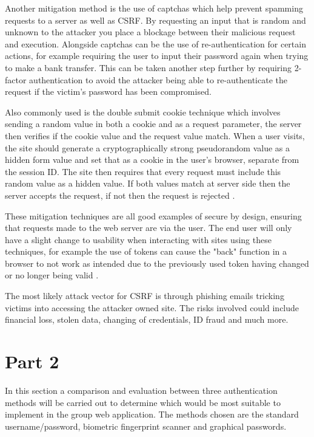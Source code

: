 \documentclass{ueacmpstyle}
\begin{document}
      Another mitigation method is the use of captchas which help prevent spamming requests 
      to a server as well as CSRF. By requesting an input that is random and unknown to the 
      attacker you place a blockage between their malicious request and execution. 
      Alongside captchas can be the use of re-authentication for certain actions, for example 
      requiring the user to input their password again when trying to make a bank transfer. 
      This can be taken another step further by requiring 2-factor authentication to avoid 
      the attacker being able to re-authenticate the request if the victim's password has been 
      compromised.

      Also commonly used is the double submit cookie technique which involves sending a random 
      value in both a cookie and as a request parameter, the server then verifies if the 
      cookie value and the request value match. When a user visits, the site should generate 
      a cryptographically strong pseudorandom value as a hidden form value and set that as 
      a cookie in the user's browser, separate from the session ID. The site then requires that 
      every request must include this random value as a hidden value. If both values match at 
      server side then the server accepts the request, if not then the request is rejected 
      \citep{OWASPCSRFPrevention}.

      These mitigation techniques are all good examples of secure by design, ensuring that 
      requests made to the web server are via the user. The end user will only have a slight 
      change to usability when interacting with sites using these techniques, for example the 
      use of tokens can cause the "back" function in a browser to not work as intended due to 
      the previously used token having changed or no longer being valid \citep{OWASPCSRFPrevention}.
      
      The most likely attack vector for CSRF is through phishing emails tricking victims into 
      accessing the attacker owned site. The risks involved could include financial loss, 
      stolen data, changing of credentials, ID fraud and much more. 
        
    \newpage
    \section{Part 2}\label{sec:Pt2}
    In this section a comparison and evaluation between three authentication methods will 
    be carried out to determine which would be most suitable to implement in the group web 
    application. The methods chosen are the standard username/password, biometric 
    fingerprint scanner and graphical passwords.
    
\end{document}
